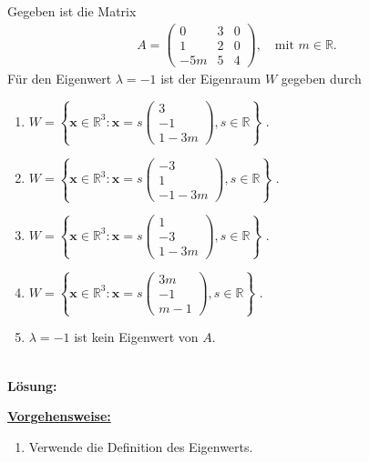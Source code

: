 \subsection*{}
Gegeben ist die Matrix
\begin{align*}
	A =
	\begin{pmatrix}
		0 & 3 & 0 \\
		1 & 2 & 0 \\
		-5m & 5 & 4
	\end{pmatrix}
	, 
	\quad 
	\textrm{mit } m \in \mathbb{R}.
\end{align*}
Für den Eigenwert $ \lambda = -1 $ ist der Eigenraum $ W $ gegeben durch
\renewcommand{\labelenumi}{(\alph{enumi})}
\begin{enumerate}
	\item 
	$ W
	=
	\left\{
	\textbf{x} \in \mathbb{R}^3
	:
	\textbf{x}
	=
	s 
	\begin{pmatrix}
		3 \\ -1 \\ 1 - 3m
	\end{pmatrix},
	s \in \mathbb{R}
	\right\}
	$
	.
	\item 
	$ W
	=
	\left\{
	\textbf{x} \in \mathbb{R}^3
	:
	\textbf{x}
	=
	s	 
	\begin{pmatrix}
		-3 \\ 1 \\ -1 - 3m
	\end{pmatrix},
	s \in \mathbb{R}
	\right\}
	$
	.
	\item
	$ W
	=
	\left\{
	\textbf{x} \in \mathbb{R}^3
	:
	\textbf{x}
	=
	s	 
	\begin{pmatrix}
		1 \\ -3 \\ 1 - 3m
	\end{pmatrix},
	s \in \mathbb{R}
	\right\}
	$
	.
	\item
	$ W
	=
	\left\{
	\textbf{x} \in \mathbb{R}^3
	:
	\textbf{x}
	=
	s	 
	\begin{pmatrix}
		3m \\ -1 \\ m-1
	\end{pmatrix},
	s \in \mathbb{R}
	\right\}
	$
	.
	\item
	$ \lambda = -1 $ ist kein Eigenwert von $ A $.
\end{enumerate}
\ \\
\textbf{Lösung:}
\begin{mdframed}
\underline{\textbf{Vorgehensweise:}}
\renewcommand{\labelenumi}{\theenumi.}
\begin{enumerate}
\item Verwende die Definition des Eigenwerts.
\end{enumerate}
\end{mdframed}

